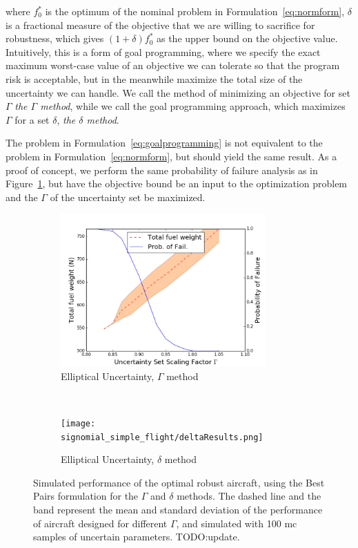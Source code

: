 where $f_0^*$ is the optimum of the nominal problem in Formulation~\ref{eq:normform}, $\delta$
is a fractional measure of the objective that we are willing to sacrifice for robustness, which
gives $(1+\delta)f_0^*$ as the upper bound on the objective value. Intuitively,
this is a form of goal programming,
where we specify the exact maximum worst-case value of an objective we can tolerate so that the program
risk is acceptable, but in the meanwhile maximize the total size of the uncertainty we can handle.
We call the method of minimizing an objective for set ${\Gamma}$ \emph{the $\Gamma$ method},
while we call the goal programming approach, which maximizes $\Gamma$ for a set $\delta$,
\emph{the $\delta$ method}.

The problem in Formulation~\ref{eq:goalprogramming} is not equivalent to the problem in Formulation~\ref{eq:normform},
but should yield the same result. As a proof of concept, we perform the same probability of failure
analysis as in Figure~\ref{fig:deltaVsGamma}, but have the objective bound be an input to the
optimization problem and the $\Gamma$ of the uncertainty set be maximized.

\begin{figure}[ht]
    \centering
    \captionsetup{justification=centering, font=small}
    \begin{subfigure}{0.49\textwidth}
        \centering
        \includegraphics[height=2.3in]{signomial_simple_flight/ell_best_pairs.png}
         \caption{Elliptical Uncertainty, $\Gamma$ method}
    \end{subfigure}%
    ~
    \begin{subfigure}{0.49\textwidth}
        \centering
        \texttt{[image: signomial\_simple\_flight/deltaResults.png]}
         \caption{Elliptical Uncertainty, $\delta$ method}
    \end{subfigure}
    \caption{Simulated performance of the optimal robust aircraft, using the Best Pairs formulation
    for the $\Gamma$ and $\delta$ methods.
    The dashed line and the band represent the mean and standard deviation of the performance
    of aircraft designed for different $\Gamma$,
    and simulated with 100 \gls{mc} samples of uncertain parameters. TODO:update.}
    \label{fig:deltaVsGamma}
\end{figure}

